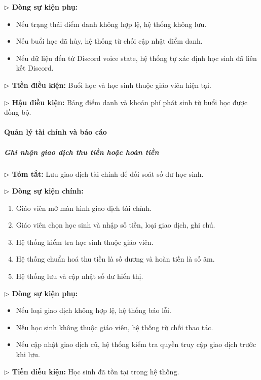 \documentclass[12pt,a4paper]{article}
\newcommand{\code}[1]{{\ttfamily\seqsplit{#1}}}
\begin{document}
\textbf{$\triangleright$ Dòng sự kiện phụ:}
\begin{itemize}[leftmargin=*]
\item Nếu trạng thái điểm danh không hợp lệ, hệ thống không lưu.
\item Nếu buổi học đã hủy, hệ thống từ chối cập nhật điểm danh.
\item Nếu dữ liệu đến từ Discord voice state, hệ thống tự xác định học sinh đã liên kết Discord.
\end{itemize}

\textbf{$\triangleright$ Tiền điều kiện:} Buổi học và học sinh thuộc giáo viên hiện tại.

\textbf{$\triangleright$ Hậu điều kiện:} Bảng điểm danh và khoản phí phát sinh từ buổi học được đồng bộ.

\paragraph{Quản lý tài chính và báo cáo}

\subparagraph{Ghi nhận giao dịch thu tiền hoặc hoàn tiền}
\textbf{$\triangleright$ Tóm tắt:} Lưu giao dịch tài chính để đối soát số dư học sinh.

\textbf{$\triangleright$ Dòng sự kiện chính:}
\begin{enumerate}[leftmargin=*]
\item Giáo viên mở màn hình giao dịch tài chính.
\item Giáo viên chọn học sinh và nhập số tiền, loại giao dịch, ghi chú.
\item Hệ thống kiểm tra học sinh thuộc giáo viên.
\item Hệ thống chuẩn hoá thu tiền là số dương và hoàn tiền là số âm.
\item Hệ thống lưu \code{Transaction} và cập nhật số dư hiển thị.
\end{enumerate}

\textbf{$\triangleright$ Dòng sự kiện phụ:}
\begin{itemize}[leftmargin=*]
\item Nếu loại giao dịch không hợp lệ, hệ thống báo lỗi.
\item Nếu học sinh không thuộc giáo viên, hệ thống từ chối thao tác.
\item Nếu cập nhật giao dịch cũ, hệ thống kiểm tra quyền truy cập giao dịch trước khi lưu.
\end{itemize}

\textbf{$\triangleright$ Tiền điều kiện:} Học sinh đã tồn tại trong hệ thống.
\end{document}
